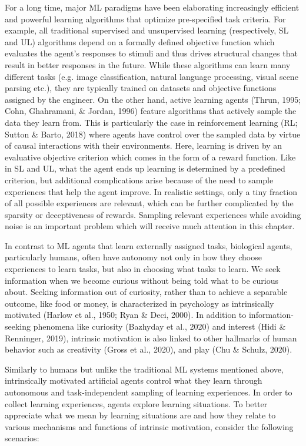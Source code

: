 For a long time, major ML paradigms have been elaborating increasingly efficient and powerful learning algorithms that optimize pre-specified task criteria. For example, all traditional supervised and unsupervised learning (respectively, SL and UL) algorithms depend on a formally defined objective function which evaluates the agent’s responses to stimuli and thus drives structural changes that result in better responses in the future. While these algorithms can learn many different tasks (e.g. image classification, natural language processing, visual scene parsing etc.), they are typically trained on datasets and objective functions assigned by the engineer. On the other hand, active learning agents (Thrun, 1995; Cohn, Ghahramani, \& Jordan, 1996) feature algorithms that actively sample the data they learn from. This is particularly the case in reinforcement learning (RL; Sutton \& Barto, 2018) where agents have control over the sampled data by virtue of causal interactions with their environments. Here, learning is driven by an evaluative objective criterion which comes in the form of a reward function. Like in SL and UL, what the agent ends up learning is determined by a predefined criterion, but additional complications arise because of the need to sample experiences that help the agent improve. In realistic settings, only a tiny fraction of all possible experiences are relevant, which can be further complicated by the sparsity or deceptiveness of rewards. Sampling relevant experiences while avoiding noise is an important problem which will receive much attention in this chapter.

In contrast to ML agents that learn externally assigned tasks, biological agents, particularly humans, often have autonomy not only in how they choose experiences to learn tasks, but also in choosing what tasks to learn. We seek information when we become curious without being told what to be curious about. Seeking information out of curiosity, rather than to achieve a separable outcome, like food or money, is characterized in psychology as intrinsically motivated (Harlow et al., 1950; Ryan \& Deci, 2000). In addition to information-seeking phenomena like curiosity (Bazhyday et al., 2020) and interest (Hidi \& Renninger, 2019), intrinsic motivation is also linked to other hallmarks of human behavior such as creativity (Gross et al., 2020), and play (Chu \& Schulz, 2020).

Similarly to humans but unlike the traditional ML systems mentioned above, intrinsically motivated artificial agents control what they learn through autonomous and task-independent sampling of learning experiences. In order to collect learning experiences, agents explore learning situations. To better appreciate what we mean by learning situations are and how they relate to various mechanisms and functions of intrinsic motivation, consider the following scenarios:


